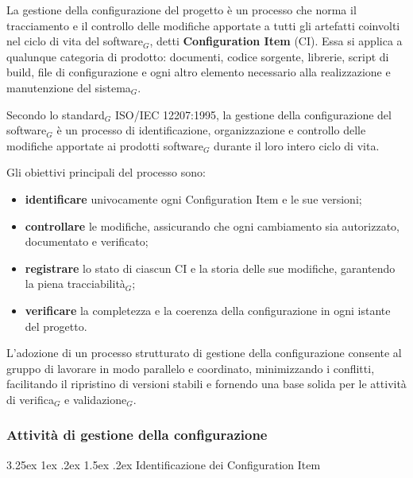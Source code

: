 \documentclass[a4paper, 10pt]{article}
\makeatletter
\renewcommand\paragraph{\@startsection{paragraph}{4}{\z@}%
  {3.25ex \@plus1ex \@minus .2ex}%
  {1.5ex \@plus .2ex}%
  {\normalfont\normalsize\bfseries}}
\makeatother
\begin{document}
La gestione della configurazione del progetto è un processo che norma il tracciamento e il controllo delle modifiche apportate a tutti gli artefatti coinvolti nel ciclo di vita del software$_G$, detti \textbf{Configuration Item} (CI). Essa si applica a qualunque categoria di prodotto: documenti, codice sorgente, librerie, script di build, file di configurazione e ogni altro elemento necessario alla realizzazione e manutenzione del sistema$_G$.

Secondo lo standard$_G$ ISO/IEC 12207:1995, la gestione della configurazione del software$_G$ è un processo di identificazione, organizzazione e controllo delle modifiche apportate ai prodotti software$_G$ durante il loro intero ciclo di vita. 

Gli obiettivi principali del processo sono:
\begin{itemize}
    \item \textbf{identificare} univocamente ogni Configuration Item e le sue versioni;
    \item \textbf{controllare} le modifiche, assicurando che ogni cambiamento sia autorizzato, documentato e verificato;
    \item \textbf{registrare} lo stato di ciascun CI e la storia delle sue modifiche, garantendo la piena tracciabilità$_G$;
    \item \textbf{verificare} la completezza e la coerenza della configurazione in ogni istante del progetto.
\end{itemize}

L'adozione di un processo strutturato di gestione della configurazione consente al gruppo di lavorare in modo parallelo e coordinato, minimizzando i conflitti, facilitando il ripristino di versioni stabili e fornendo una base solida per le attività di verifica$_G$ e validazione$_G$.

\subsubsection{Attività di gestione della configurazione}
\label{subsubsec:attivita_configurazione}

\paragraph{Identificazione dei Configuration Item}
\end{document}
